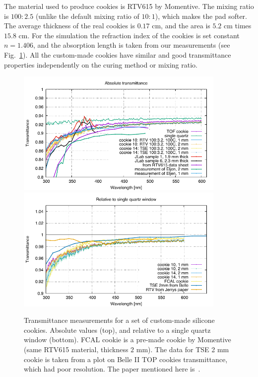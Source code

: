 The material used to produce cookies is RTV615 by Momentive. The mixing ratio is $100 : 2.5$ (unlike the default mixing ratio of $10 : 1$), which makes the pad softer. The average thickness of the real cookies is $0.17$ cm, and the area is $5.2$ cm times $15.8$ cm. For the simulation the refraction index of the cookies is set constant $n = 1.406$, and the absorption length is taken from our measurements (see Fig.~\ref{pic:coo}). All the custom-made cookies have similar and good transmittance properties independently on the curing method or mixing ratio.

\begin{figure}[!tb]
\centering
\includegraphics[angle=0,width=0.9\textwidth]{pics/transmittance1.pdf} \\
\includegraphics[angle=0,width=0.9\textwidth]{pics/cookie10_relQuartz.pdf}
\caption{\label{pic:coo}
Transmittance measurements for a set of custom-made silicone cookies. Absolute values (top), and relative to a single quartz window  (bottom). FCAL cookie is a pre-made cookie by Momentive (same RTV615 material, thickness $2$ mm). The data for TSE 2 mm cookie is taken from a plot on Belle II TOP cookies transmittance, which had poor resolution. The paper mentioned here is~\cite{slacpub}.
}
\end{figure}

